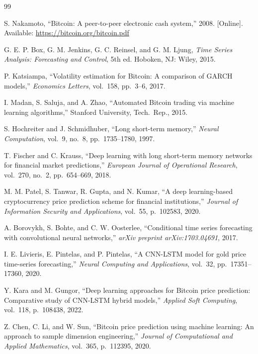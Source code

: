\documentclass[12pt]{article}
\begin{document}
\newpage
\begin{thebibliography}{99}

S. Nakamoto, ``Bitcoin: A peer-to-peer electronic cash system,'' 2008. [Online]. Available: \url{https://bitcoin.org/bitcoin.pdf}

G. E. P. Box, G. M. Jenkins, G. C. Reinsel, and G. M. Ljung, \textit{Time Series Analysis: Forecasting and Control}, 5th ed. Hoboken, NJ: Wiley, 2015.

P. Katsiampa, ``Volatility estimation for Bitcoin: A comparison of GARCH models,'' \textit{Economics Letters}, vol.\ 158, pp.\ 3--6, 2017.

I. Madan, S. Saluja, and A. Zhao, ``Automated Bitcoin trading via machine learning algorithms,'' Stanford University, Tech.\ Rep., 2015.

S. Hochreiter and J. Schmidhuber, ``Long short-term memory,'' \textit{Neural Computation}, vol.\ 9, no.\ 8, pp.\ 1735--1780, 1997.

T. Fischer and C. Krauss, ``Deep learning with long short-term memory networks for financial market predictions,'' \textit{European Journal of Operational Research}, vol.\ 270, no.\ 2, pp.\ 654--669, 2018.

M. M. Patel, S. Tanwar, R. Gupta, and N. Kumar, ``A deep learning-based cryptocurrency price prediction scheme for financial institutions,'' \textit{Journal of Information Security and Applications}, vol.\ 55, p.\ 102583, 2020.

A. Borovykh, S. Bohte, and C. W. Oosterlee, ``Conditional time series forecasting with convolutional neural networks,'' \textit{arXiv preprint arXiv:1703.04691}, 2017.

I. E. Livieris, E. Pintelas, and P. Pintelas, ``A CNN-LSTM model for gold price time-series forecasting,'' \textit{Neural Computing and Applications}, vol.\ 32, pp.\ 17351--17360, 2020.

Y. Kara and M. Gungor, ``Deep learning approaches for Bitcoin price prediction: Comparative study of CNN-LSTM hybrid models,'' \textit{Applied Soft Computing}, vol.\ 118, p.\ 108438, 2022.

Z. Chen, C. Li, and W. Sun, ``Bitcoin price prediction using machine learning: An approach to sample dimension engineering,'' \textit{Journal of Computational and Applied Mathematics}, vol.\ 365, p.\ 112395, 2020.


\end{thebibliography}
\end{document}
